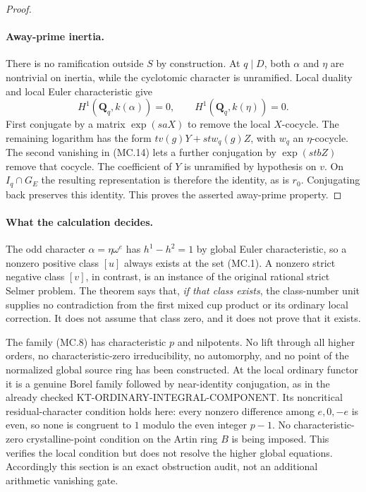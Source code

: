 \begin{proof}
\paragraph{Away-prime inertia.}
There is no ramification outside $S$ by construction.
At $q\mid D$, both $\alpha$ and $\eta$ are nontrivial on
inertia, while the cyclotomic character is unramified.
Local duality and local Euler characteristic give
\[
 H^1(\mathbf Q_q,k(\alpha))=0,
 \qquad H^1(\mathbf Q_q,k(\eta))=0.                     \tag{MC.14}
\]
First conjugate by a matrix $\exp(saX)$ to remove the local
$X$-cocycle.  The remaining logarithm has the form
$t v(g)Y+st w_q(g)Z$, with $w_q$ an $\eta$-cocycle.
The second vanishing in (MC.14) lets a further conjugation
by $\exp(stbZ)$ remove that cocycle.
The coefficient of $Y$ is unramified by hypothesis on $v$.
On $I_q\cap G_E$ the resulting representation is therefore
the identity, as is $r_0$.  Conjugating back preserves this
identity.  This proves the asserted away-prime property.
\end{proof}

\paragraph{What the calculation decides.}
The odd character $\alpha=\eta\omega^e$ has
$h^1-h^2=1$ by global Euler characteristic, so a nonzero
positive class $[u]$ always exists at the set (MC.1).
A nonzero strict negative class $[v]$, in contrast, is an
instance of the original rational strict Selmer problem.
The theorem says that, \emph{if that class exists}, the
class-number unit supplies no contradiction from the first
mixed cup product or its ordinary local correction.
It does not assume that class zero, and it does not prove
that it exists.

The family (MC.8) has characteristic $p$ and nilpotents.
No lift through all higher orders, no characteristic-zero
irreducibility, no automorphy, and no point of the normalized
global source ring has been constructed.  At the local
ordinary functor it is a genuine Borel family followed by
near-identity conjugation, as in the already checked
KT-ORDINARY-INTEGRAL-COMPONENT.  Its noncritical residual-character
condition holds here: every nonzero difference among $e,0,-e$
is even, so none is congruent to $1$ modulo the even integer
$p-1$.  No characteristic-zero crystalline-point condition
on the Artin ring $B$ is being imposed.
This verifies the local condition but does not resolve the
higher global equations.
Accordingly this section is an exact obstruction audit,
not an additional arithmetic vanishing gate.

